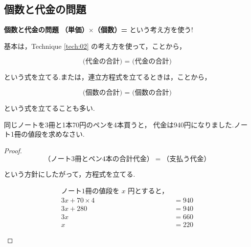 \subsection{個数と代金の問題}

\begin{techniquebox}[tech:02]{\textbf{個数と代金の問題}}
    \textbf{（単価）$\times$（個数）= \fitblankbf[代金]{}} という考え方を使う!
\end{techniquebox}

    基本は，Technique \ref{tech:02} の考え方を使って，ことから，

    \[\textbf{(代金の合計) = (代金の合計)}\]

    \vspace{1.5em}
    という式を立てる.または，連立方程式を立てるときは，ことから，

    \[\textbf{(個数の合計) = (個数の合計)}\]

    という式を立てることも多い.

    \begin{example}[【例題 1】]
        同じノートを3冊と1本70円のペンを4本買うと，
        代金は940円になりました.ノート1冊の値段を求めなさい.
    \end{example}

    \begin{proof}\mbox{}\\
        \[（ノート3冊とペン4本の合計代金）=（支払う代金）\]

        という方針にしたがって，方程式を立てる.

        \begin{hiddenanswer}
            \begin{align*}
                \text{ノート1冊の値段を $x$ 円とすると，}\\
                3x + 70 \times 4 &= 940 \\
                3x + 280 &= 940 \\
                3x &= 660 \\
                x &= 220
            \end{align*}

        \end{hiddenanswer}
    \end{proof}

\newpage
